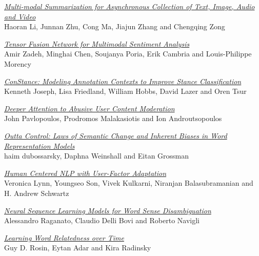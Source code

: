 \hyperlink{page.1101}{\em Multi-modal Summarization for Asynchronous Collection of Text, Image, Audio and Video}\samepage \\
\hspace*{7mm} Haoran Li, Junnan Zhu, Cong Ma, Jiajun Zhang and Chengqing Zong\dotfill {}

\hyperlink{page.1112}{\em Tensor Fusion Network for Multimodal Sentiment Analysis}\samepage \\
\hspace*{7mm} Amir Zadeh, Minghai Chen, Soujanya Poria, Erik Cambria and Louis-Philippe Morency\dotfill {}

\hyperlink{page.1124}{\em ConStance: Modeling Annotation Contexts to Improve Stance Classification}\samepage \\
\hspace*{7mm} Kenneth Joseph, Lisa Friedland, William Hobbs, David Lazer and Oren Tsur\dotfill {}

\hyperlink{page.1134}{\em Deeper Attention to Abusive User Content Moderation}\samepage \\
\hspace*{7mm} John Pavlopoulos, Prodromos Malakasiotis and Ion Androutsopoulos\dotfill {}

\hyperlink{page.1145}{\em Outta Control: Laws of Semantic Change and Inherent Biases in Word Representation Models}\samepage \\
\hspace*{7mm} haim dubossarsky, Daphna Weinshall and Eitan Grossman\dotfill {}

\hyperlink{page.1155}{\em Human Centered NLP with User-Factor Adaptation}\samepage \\
\hspace*{7mm} Veronica Lynn, Youngseo Son, Vivek Kulkarni, Niranjan Balasubramanian and H. Andrew Schwartz\dotfill {}

\hyperlink{page.1165}{\em Neural Sequence Learning Models for Word Sense Disambiguation}\samepage \\
\hspace*{7mm} Alessandro Raganato, Claudio Delli Bovi and Roberto Navigli\dotfill {}

\hyperlink{page.1177}{\em Learning Word Relatedness over Time}\samepage \\
\hspace*{7mm} Guy D. Rosin, Eytan Adar and Kira Radinsky\dotfill {}

